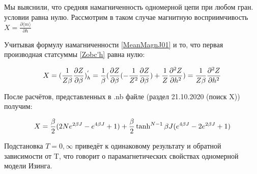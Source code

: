 Мы выяснили, что средняя намагниченность одномерной цепи при любом гран. условии равна нулю. Рассмотрим в таком случае магнитную восприимчивость $ X = \frac{\partial \langle m \rangle}{\partial h}$

Учитывая формулу намагниченности \eqref{MeanMagnJ01} и то, что первая производная статсуммы \eqref{Zobc'h} равна нулю:

\[ X = (\frac{1}{Z \beta} \frac{\partial Z}{\partial \beta})^{'}_{h} = \frac{1}{\beta} (\frac{\partial Z}{\partial \beta} (- \frac{1}{Z^{2}} \frac{\partial Z}{\partial \beta}) + \frac{1}{Z} \frac{\partial^{2} Z}{\partial h^{2}}) = \frac{1}{Z \beta} \frac{\partial^{2} Z}{\partial h^{2}}\]

После расчётов, представленных в .nb файле (раздел 21.10.2020 (поиск X)) получим:

\[ X = \frac{\beta}{2} (2Ne^{2\beta J} - e^{4\beta J} + 1) + \frac{\beta}{2} \tanh^{N-1}\beta J (e^{4\beta J} - 2 e^{2\beta J} + 1)\]

Подстановка $ T = 0, \infty$ приведёт к одинаковому результату и обратной зависимости от T, что говорит о парамагнетических свойствах одномерной модели Изинга.